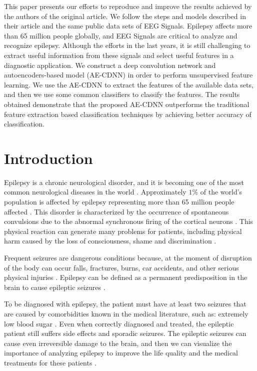 
This paper presents our efforts to reproduce and improve the results achieved by the authors of the original article. We follow the steps and models described in their article and the same public data sets of EEG Signals. Epilepsy affects more than 65 million people globally, and EEG Signals are critical to analyze and recognize epilepsy. Although the efforts in the last years, it is still challenging to extract useful information from these signals and select useful features in a diagnostic application. We construct a deep convolution network and autoencoders-based model (AE-CDNN) in order to perform unsupervised feature learning. We use the AE-CDNN to extract the features of the available data sets, and then we use some common classifiers to classify the features. The results obtained demonstrate that the proposed AE-CDNN outperforms the traditional feature extraction based classification techniques by achieving better accuracy of classification.

\section{Introduction}

Epilepsy is a chronic neurological disorder, and it is becoming one of the most common neurological diseases in the world \cite{most_commum:2002}. Approximately $1\%$ of the world's population is affected by epilepsy representing more than 65 million people affected \cite{global-epilepsy:2019,Epilepsia:2010}. This disorder is characterized by the occurrence of spontaneous convulsions due to the abnormal synchronous firing of the cortical neurons \cite{stafstrom2015seizures}. This physical reaction can generate many problems for patients, including physical harm caused by the loss of consciousness, shame and discrimination \cite{thomas2011confronting}.

Frequent seizures are dangerous conditions because, at the moment of disruption of the body can occur falls, fractures, burns, car accidents, and other serious physical injuries \cite{mollaouglu2013injuries}. Epilepsy can be defined as a permanent predisposition in the brain to cause epileptic seizures \cite{stafstrom2015seizures}.

To be diagnosed with epilepsy, the patient must have at least two seizures that are caused by comorbidities known in the medical literature, such as: extremely low blood sugar \cite{schauwecker2012effects}. Even when correctly diagnosed and treated, the epileptic patient still suffers side effects and sporadic seizures. The epileptic seizures can cause even irreversible damage to the brain, and then we can visualize the importance of analyzing epilepsy to improve the life quality and the medical treatments for these patients \cite{stafstrom2015seizures}. 

